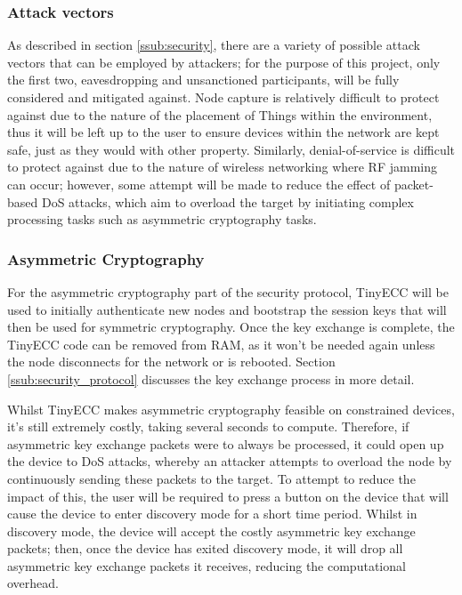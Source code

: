 \documentclass{mprop}
\begin{document}
\subsubsection{Attack vectors} %
\label{ssub:attack_vectors}
As described in section \ref{ssub:security}, there are a variety of possible attack vectors that can be employed by attackers; for the purpose of this project, only the first two, eavesdropping and unsanctioned participants, will be fully considered and mitigated against. Node capture is relatively difficult to protect against due to the nature of the placement of Things within the environment, thus it will be left up to the user to ensure devices within the network are kept safe, just as they would with other property. Similarly, denial-of-service is difficult to protect against due to the nature of wireless networking where RF jamming can occur; however, some attempt will be made to reduce the effect of packet-based DoS attacks, which aim to overload the target by initiating complex processing tasks such as asymmetric cryptography tasks. 


\subsubsection{Asymmetric Cryptography} %
\label{ssub:asymmetric_key_cryptography}
For the asymmetric cryptography part of the security protocol, TinyECC\cite{TinyECC} will be used to initially authenticate new nodes and bootstrap the session keys that will then be used for symmetric cryptography. Once the key exchange is complete, the TinyECC code can be removed from RAM, as it won't be needed again unless the node disconnects for the network or is rebooted. Section \ref{ssub:security_protocol} discusses the key exchange process in more detail.

Whilst TinyECC makes asymmetric cryptography feasible on constrained devices, it's still extremely costly, taking several seconds to compute. Therefore, if asymmetric key exchange packets were to always be processed, it could open up the device to DoS attacks, whereby an attacker attempts to overload the node by continuously sending these packets to the target. To attempt to reduce the impact of this, the user will be required to press a button on the device that will cause the device to enter discovery mode for a short time period. Whilst in discovery mode, the device will accept the costly asymmetric key exchange packets; then, once the device has exited discovery mode, it will drop all asymmetric key exchange packets it receives, reducing the computational overhead.
\end{document}

